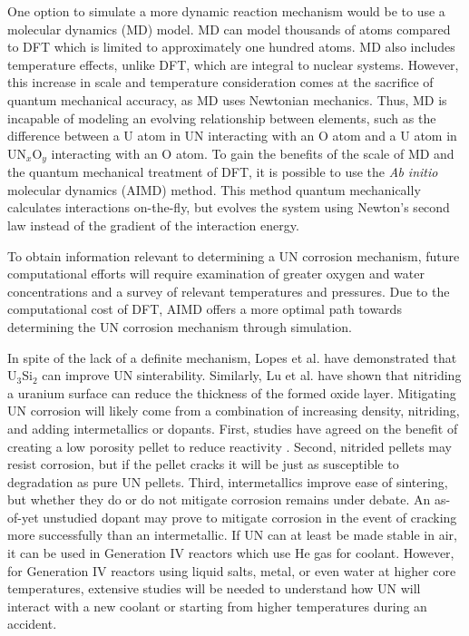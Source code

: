 \documentclass[11pt]{article}
\begin{document}
\begin{multicols}{2}
One option to simulate a more dynamic reaction mechanism would be to use a molecular dynamics (MD) model. MD can model thousands of atoms compared to DFT which is limited to approximately one hundred atoms. MD also includes temperature effects, unlike DFT, which are integral to nuclear systems. However, this increase in scale and temperature consideration comes at the sacrifice of quantum mechanical accuracy, as MD uses Newtonian mechanics. Thus, MD is incapable of modeling an evolving relationship between elements, such as the difference between a U atom in UN interacting with an O atom and a U atom in UN$_{x}$O$_{y}$ interacting with an O atom. To gain the benefits of the scale of MD and the quantum mechanical treatment of DFT, it is possible to use the \textit{Ab initio} molecular dynamics (AIMD) method. This method quantum mechanically calculates interactions on-the-fly, but evolves the system using Newton's second law instead of the gradient of the interaction energy. 
\par 
To obtain information relevant to determining a UN corrosion mechanism, future computational efforts will require examination of greater oxygen and water concentrations and a survey of relevant temperatures and pressures. Due to the computational cost of DFT, AIMD offers a more optimal path towards determining the UN corrosion mechanism through simulation.
\par In spite of the lack of a definite mechanism, Lopes et al. \cite{Lopes2017} have demonstrated that U$_{3}$Si$_{2}$ can improve UN sinterability. Similarly, Lu et al. \cite{Lu2016} have shown that nitriding a uranium surface can reduce the thickness of the formed oxide layer.
Mitigating UN corrosion will likely come from a combination of increasing density, nitriding, and adding intermetallics or dopants. First, studies have agreed on the benefit of creating a low porosity pellet to reduce reactivity \cite{Lopes2017,Johnson2016,Jolkkonen2017}. Second, nitrided pellets may resist corrosion, but if the pellet cracks it will be just as susceptible to degradation as pure UN pellets. Third, intermetallics improve ease of sintering, but whether they do or do not mitigate corrosion remains under debate. An as-of-yet unstudied dopant may prove to mitigate corrosion in the event of cracking more successfully than an intermetallic. If UN can at least be made stable in air, it can be used in Generation IV reactors which use He gas for coolant. However, for Generation IV reactors using liquid salts, metal, or even water at higher core temperatures, extensive studies will be needed to understand how UN will interact with a new coolant or starting from higher temperatures during an accident.

\end{multicols}
\end{document}
